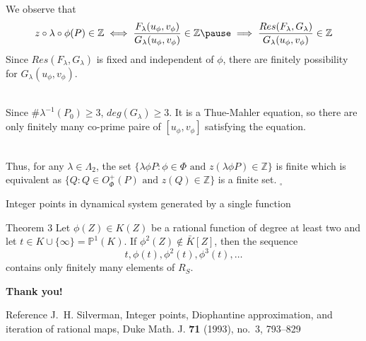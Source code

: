 \documentclass[aspectratio=169,xcolor=dvipsnames]{beamer}
\begin{document}
\begin{frame}
    We observe that
    $$z\circ\lambda\circ\phi (P)\in \mathbb{Z} \iff \frac{F_\lambda(u_\phi, v_\phi)}{G_\lambda(u_\phi, v_\phi)}\in \mathbb{Z} \pause \implies \frac{Res(F_\lambda, G_\lambda)}{G_\lambda(u_\phi, v_\phi)}\in \mathbb{Z}$$ \pause
    Since $Res(F_\lambda, G_\lambda)$ is fixed and independent of $\phi$, there are finitely possibility for $G_\lambda(u_\phi, v_\phi)$.\pause \\~

    Since $\# \lambda^{-1}(P_0) \geq 3$, $deg(G_\lambda)\geq3$. It is a Thue-Mahler equation, so there are only finitely many co-prime paire of $[u_\phi,v_\phi]$ satisfying the equation.\pause \\~
    
    Thus, for any $\lambda \in \Lambda_2$, the set $\{\lambda\phi P: \phi \in \Phi \text{ and } z(\lambda\phi P)\in \mathbb{Z}\}$ is finite which is equivalent as $\{Q: Q \in O^+_\Phi(P) \text{ and } z(Q)\in \mathbb{Z}\}$ is a finite set. $_\square$
\end{frame}

\begin{frame}{Integer points in dynamical system generated by a single function}
    \begin{block}{Theorem 3}
        Let $\phi(Z)\in K(Z)$ be a rational function of degree at least two and let $t \in K \cup \{\infty\} = \mathbb{P}^1(K)$. If $\phi^2(Z)\not\in \bar{K}[Z]$, then the sequence 
        $$t, \phi(t),\phi^2(t), \phi^3(t),\dots$$
        contains only finitely many elements of $R_S$.
    \end{block}
\end{frame}

\begin{frame}
    \Huge{\centerline{\textbf{Thank you!}}}
\end{frame}

\begin{frame}{Reference}
    J.~H. Silverman, Integer points, Diophantine approximation, and iteration of rational maps, Duke Math. J. {\bf 71} (1993), no.~3, 793--829
\end{frame}
\end{document}
